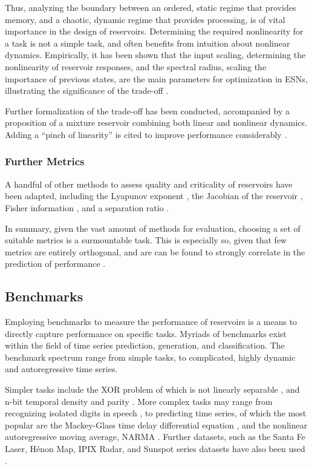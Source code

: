 Thus, analyzing the boundary between an ordered, static regime that provides
memory, and a chaotic, dynamic regime that provides processing, is of vital
importance in the design of reservoirs. Determining the required nonlinearity
for a task is not a simple task, and often benefits from intuition about
nonlinear dynamics. Empirically, it has been shown that the input scaling,
determining the nonlinearity of reservoir responses, and the spectral radius,
scaling the importance of previous states, are the main parameters for
optimization in ESNs, illustrating the significance of the trade-off
\cite{montavon_practical_2012}.

Further formalization of the trade-off has been conducted, accompanied by a
proposition of a mixture reservoir combining both linear and nonlinear
dynamics. Adding a ``pinch of linearity'' is cited to improve performance
considerably \cite{inubushi_reservoir_2017}.

\subsubsection{Further Metrics}

A handful of other methods to assess quality and criticality of reservoirs have
been adapted, including the Lyapunov exponent
\cite{verstraeten_experimental_2007}, the Jacobian of the reservoir
\cite{alippi_quantification_2009}, Fisher information
\cite{livi_determination_2018}, and a separation ratio
\cite{gibbons_unifying_2010}.

In summary, given the vast amount of methods for evaluation, choosing a set of
suitable metrics is a surmountable task. This is especially so, given that few
metrics are entirely orthogonal, and are can be found to strongly correlate in
the prediction of performance \cite{chrol-cannon_correlation_2014}.

\subsection{Benchmarks}

Employing benchmarks to measure the performance of reservoirs is a means to
directly capture performance on specific tasks. Myriads of benchmarks exist
within the field of time series prediction, generation, and classification. The
benchmark spectrum range from simple tasks, to complicated, highly dynamic and
autoregressive time series.

Simpler tasks include the XOR problem of which is not linearly separable
\cite{goos_pattern_2003}, and n-bit temporal density and parity
\cite{bertschinger_real-time_2004}. More complex tasks may range from
recognizing isolated digits in speech \cite{verstraeten_isolated_2005}, to
predicting time series, of which the most popular are the Mackey-Glass time
delay differential equation \cite{mackey_oscillation_1977}, and the nonlinear
autoregressive moving average, NARMA \cite{atiya_new_2000}. Further datasets,
such as the Santa Fe Laser, Hénon Map, IPIX Radar, and Sunspot series datasets
have also been used \cite{rodan_minimum_2011}.

